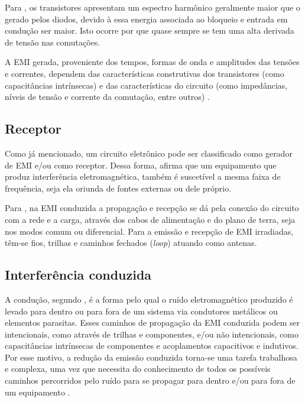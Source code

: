         Para , os transistores apresentam um espectro harmônico geralmente maior que o gerado pelos diodos, devido à essa energia associada ao bloqueio e entrada em condução ser maior. Isto ocorre por que quase sempre se tem uma alta derivada de tensão nas comutações.
        
        A EMI gerada, proveniente dos tempos, formas de onda e amplitudes das tensões e correntes, dependem das características construtivas dos transistores (como capacitâncias intrínsecas) e das características do circuito (como impedâncias, níveis de tensão e corrente da comutação, entre outros) \cite{ref:EMC_phd_schlichting}.
        
        \subsection{Receptor} \label{cap:fund_emc_recep}
        
        Como já mencionado, um circuito eletrônico pode ser classificado como gerador de EMI e/ou como receptor. Dessa forma,  afirma que um equipamento que produz interferência eletromagnética, também é suscetível a mesma faixa de frequência, seja ela oriunda de fontes externas ou dele próprio. 
        
        Para , na EMI conduzida a propagação e recepção se dá pela conexão do circuito com a rede e a carga, através dos cabos de alimentação e do plano de terra, seja nos modos comum ou diferencial. Para a emissão e recepção de EMI irradiadas, têm-se fios, trilhas e caminhos fechados (\textit{loop}) atuando como antenas.
        
        \subsection{Interferência conduzida} \label{cap:fund_emc_intcond}
        
        A condução, segundo , é a forma pelo qual o ruído eletromagnético produzido é levado para dentro ou para fora de um sistema via condutores metálicos ou elementos parasitas. Esses caminhos de propagação da EMI conduzida podem ser intencionais, como através de trilhas e componentes, e/ou não intencionais, como capacitâncias intrínsecas de componentes e acoplamentos capacitivos e indutivos. Por esse motivo, a redução da emissão conduzida torna-se uma tarefa trabalhosa e complexa, uma vez que necessita do conhecimento de todos os possíveis caminhos percorridos pelo ruído para se propagar para dentro e/ou para fora de um equipamento \cite{ref:EMC_phd_schlichting}. 
        
